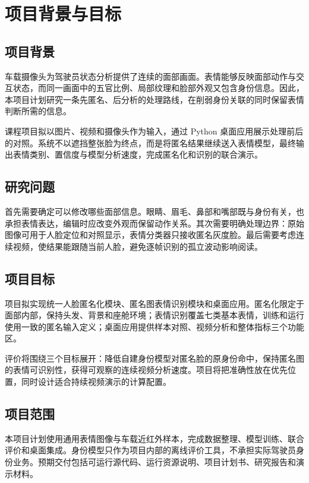 \section{项目背景与目标}
\label{sec:intro}
\subsection{项目背景}
车载摄像头为驾驶员状态分析提供了连续的面部画面。表情能够反映面部动作与交互状态，而同一画面中的五官比例、局部纹理和脸部外观又包含身份信息。因此，本项目计划研究一条先匿名、后分析的处理路线，在削弱身份关联的同时保留表情判断所需的信息。

课程项目拟以图片、视频和摄像头作为输入，通过 Python 桌面应用展示处理前后的对照。系统不以遮挡整张脸为终点，而是将匿名结果继续送入表情模型，最终输出表情类别、置信度与模型分析速度，完成匿名化和识别的联合演示。

\subsection{研究问题}
首先需要确定可以修改哪些面部信息。眼睛、眉毛、鼻部和嘴部既与身份有关，也承担表情表达，编辑时应改变外观而保留动作关系。其次需要明确处理边界：原始图像可用于人脸定位和对照显示，表情分类器只接收匿名灰度脸。最后需要考虑连续视频，使结果能跟随当前人脸，避免逐帧识别的孤立波动影响阅读。

\subsection{项目目标}
项目拟实现统一人脸匿名化模块、匿名图表情识别模块和桌面应用。匿名化限定于面部内部，保持头发、背景和座舱环境；表情识别覆盖七类基本表情，训练和运行使用一致的匿名输入定义；桌面应用提供样本对照、视频分析和整体指标三个功能区。

评价将围绕三个目标展开：降低自建身份模型对匿名脸的原身份命中，保持匿名图的表情可识别性，获得可观察的连续视频分析速度。项目将把准确性放在优先位置，同时设计适合持续视频演示的计算配置。

\subsection{项目范围}
本项目计划使用通用表情图像与车载近红外样本，完成数据整理、模型训练、联合评价和桌面集成。身份模型只作为项目内部的离线评价工具，不承担实际驾驶员身份业务。预期交付包括可运行源代码、运行资源说明、项目计划书、研究报告和演示材料。
